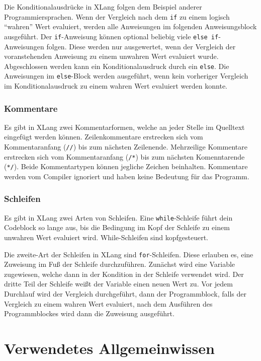 \documentclass[a4paper]{article}
\begin{document}
Die Konditionalausdrücke in XLang folgen dem Beispiel anderer Programmiersprachen.
Wenn der Vergleich nach dem \texttt{if} zu einem logisch \enquote{wahren} Wert evaluiert, werden
alle Anweisungen im folgenden Anweisungsblock ausgeführt.
Der \texttt{if}-Anweisung können optional beliebig viele \texttt{else if}-Anweisungen folgen.
Diese werden nur ausgewertet, wenn der Vergleich der voranstehenden Anweisung zu einem unwahren Wert
evaluiert wurde.
Abgeschlossen werden kann ein Konditionalausdruck durch ein \texttt{else}. Die Anweisungen im
\texttt{else}-Block werden ausgeführt, wenn kein vorheriger Vergleich im Konditionalausdruck zu
einem wahren Wert evaluiert werden konnte.

\subsubsection{Kommentare}

Es gibt in XLang zwei Kommentarformen, welche an jeder Stelle im Quelltext eingefügt werden können.
Zeilenkommentare erstrecken sich vom Kommentaranfang (\texttt{//}) bis zum nächsten Zeilenende.
Mehrzeilige Kommentare erstrecken sich vom Kommentaranfang (\texttt{/*}) bis zum nächsten
Komenntarende (\texttt{*/}).
Beide Kommentartypen können jegliche Zeichen beinhalten.
Kommentare werden vom Compiler ignoriert und haben keine Bedeutung für das Programm.

\subsubsection{Schleifen}

Es gibt in XLang zwei Arten von Schleifen. Eine \texttt{while}-Schleife führt dein Codeblock so
lange aus, bis die Bedingung im Kopf der Schleife zu einem unwahren Wert evaluiert wird.
While-Schleifen sind kopfgesteuert.

Die zweite-Art der Schleifen in XLang sind \texttt{for}-Schleifen. Diese erlauben es, eine Zuweisung
im Fuß der Schleife durchzuführen. Zunächst wird eine Variable zugewiesen, welche dann in der
Kondition in der Schleife verwendet wird. Der dritte Teil der Schleife weißt der Variable einen
neuen Wert zu. Vor jedem Durchlauf wird der Vergleich durchgeführt, dann der Programmblock, falls
der Vergleich zu einem wahren Wert evaluiert, nach dem Ausführen des Programmblockes wird dann die
Zuweisung ausgeführt.


\section{Verwendetes Allgemeinwissen}
\end{document}
